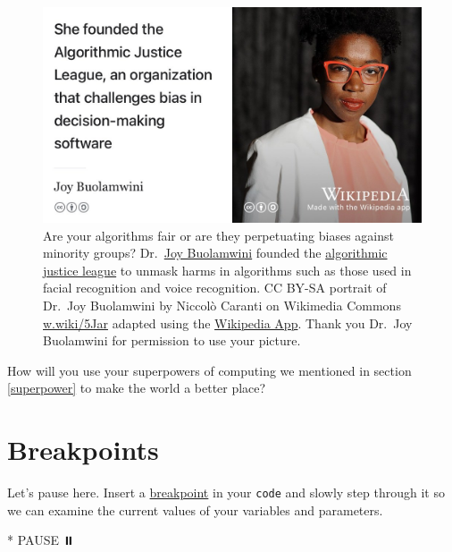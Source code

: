 \documentclass[
]{book}
\newenvironment{Shaded}{\begin{snugshade}}{\end{snugshade}}
\newcommand{\NormalTok}[1]{#1}
\newcommand{\SpecialStringTok}[1]{\textcolor[rgb]{0.31,0.60,0.02}{#1}}
\begin{document}
\begin{figure}

{\centering \includegraphics[width=1\linewidth]{images/joy-buolamwini} 

}

\caption{Are your algorithms fair or are they perpetuating biases against minority groups? Dr.~\href{https://en.wikipedia.org/wiki/Joy_Buolamwini}{Joy Buolamwini} founded the \href{https://en.wikipedia.org/wiki/Algorithmic_Justice_League}{algorithmic justice league} to unmask harms in algorithms such as those used in facial recognition and voice recognition. CC BY-SA portrait of Dr.~Joy Buolamwini by Niccolò Caranti on Wikimedia Commons \href{https://w.wiki/5Jar}{w.wiki/5Jar} adapted using the \href{https://apps.apple.com/gb/app/wikipedia/id324715238}{Wikipedia App}. Thank you Dr.~Joy Buolamwini for permission to use your picture.}\label{fig:justice-fig}
\end{figure}



How will you use your superpowers of computing we mentioned in section \ref{superpower} to make the world a better place?

\hypertarget{bp9}{%
\section{Breakpoints}\label{bp9}}

Let's pause here. Insert a \href{https://en.wikipedia.org/wiki/Breakpoint}{breakpoint} in your \texttt{code} and slowly step through it so we can examine the current values of your variables and parameters.

\begin{Shaded}
\begin{Highlighting}[]
\SpecialStringTok{* }\NormalTok{PAUSE ⏸️}
\end{Highlighting}
\end{Shaded}
\end{document}
